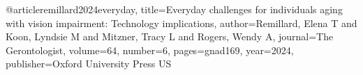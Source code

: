 @article{remillard2024everyday,
title={Everyday challenges for individuals aging with vision impairment: Technology implications},
author={Remillard, Elena T and Koon, Lyndsie M and Mitzner, Tracy L and Rogers, Wendy A},
journal={The Gerontologist},
volume={64},
number={6},
pages={gnad169},
year={2024},
publisher={Oxford University Press US}
}